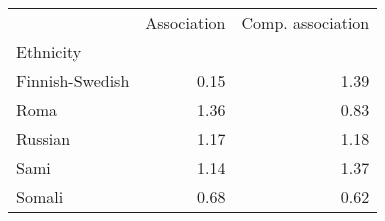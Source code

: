 \begin{tabular}{lrr}
\toprule
{} &  Association &  Comp. association \\
Ethnicity       &              &                    \\
\midrule
Finnish-Swedish &         0.15 &               1.39 \\
Roma            &         1.36 &               0.83 \\
Russian         &         1.17 &               1.18 \\
Sami            &         1.14 &               1.37 \\
Somali          &         0.68 &               0.62 \\
\bottomrule
\end{tabular}
